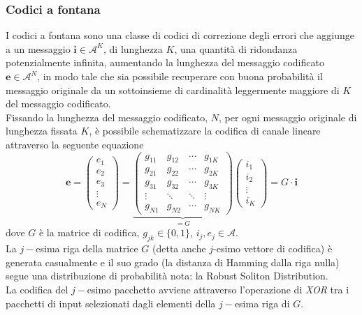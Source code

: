 \documentclass[italian, a4paper, 12pt]{article}
\begin{document}
\subsubsection{Codici a fontana}\label{FCsection}
I codici a fontana \cite{fcsurvey, rossifc} sono una classe di codici di correzione degli errori che aggiunge a un messaggio $\bm{i}\in\mathcal{A}^K$, di lunghezza $K$, una quantità di ridondanza potenzialmente infinita, aumentando la lunghezza del messaggio codificato $\bm{e}\in\mathcal{A}^N$, in modo tale che sia possibile recuperare con buona probabilità il messaggio originale da un sottoinsieme di cardinalità leggermente maggiore di $K$ del messaggio codificato.\\
Fissando la lunghezza del messaggio codificato, $N$, per ogni messaggio originale di lunghezza fissata $K$, è possibile schematizzare la codifica di canale lineare attraverso la seguente equazione
\begin{equation}
\bm{e} =
\begin{pmatrix}
e_1 \\e_2 \\e_3 \\\vdots \\e_N
\end{pmatrix} = \underbrace{\begin{pmatrix}
g_{11}	&g_{12}	&\cdots	&g_{1K}\\
g_{21}	&g_{22}	&\cdots	&g_{2K}\\
g_{31}	&g_{32}	&\cdots	&g_{3K}\\
\vdots &\ddots & \ddots &\vdots\\
g_{N1}	&g_{N2}	&\cdots	&g_{NK}
\end{pmatrix}}_{=G} \begin{pmatrix}
i_1 \\i_2 \\\vdots \\i_K
\end{pmatrix} = G \cdot \bm{i}
\end{equation}
dove $G$ è la matrice di codifica, $g_{jk}\in\{0,1\}$, $i_j, e_j\in\mathcal{A}$.\\
La $j-$esima riga della matrice $G$ (detta anche $j$-esimo vettore di codifica) è generata casualmente e il suo grado (la distanza di Hamming dalla riga nulla) segue una distribuzione di probabilità nota: la Robust Soliton Distribution.\\
La codifica del $j-$esimo pacchetto avviene attraverso l'operazione di \emph{XOR} tra i pacchetti di input selezionati dagli elementi della $j-$esima riga di $G$.\\
\end{document}
